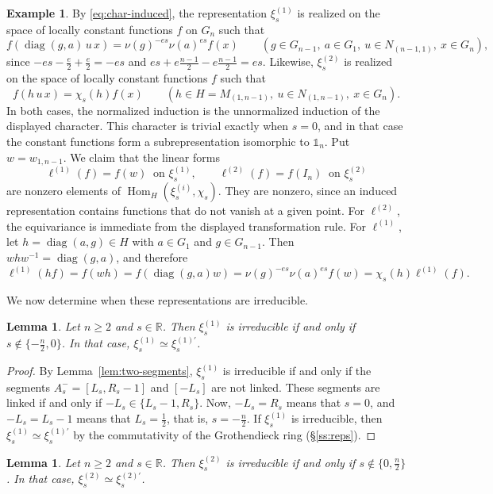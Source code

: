 \documentclass[11pt]{amsart}
\numberwithin{equation}{section}
\theoremstyle{plain}
\newtheorem{lemma}[theorem]{Lemma}
\theoremstyle{definition}
\newtheorem{example}[theorem]{Example}
\theoremstyle{remark}
\newcommand{\R}{\mathbb{R}}
\newcommand{\one}{\mathds{1}}
\DeclareMathOperator{\Hom}{Hom}
\DeclareMathOperator{\diag}{diag}
\newcommand{\xione}{\xi^{(1)}}
\newcommand{\xitwo}{\xi^{(2)}}
\begin{document}
\begin{example}\label{ex:dps-functionals}
	By \eqref{eq:char-induced}, the representation $\xione_s$ is realized on the space of locally constant functions $f$ on $G_n$ such that
	$$
	f(\diag(g,a)\,u\,x)=\nu(g)^{-es}\nu(a)^{es}f(x)\qquad(g\in G_{n-1},\ a\in G_1,\ u\in N_{(n-1,1)},\ x\in G_n),
	$$
	since $-es-\frac e2+\frac e2=-es$ and $es+e\frac{n-1}2-e\frac{n-1}2=es$. Likewise, $\xitwo_s$ is realized on the space of locally constant functions $f$ such that
	$$
	f(h\,u\,x)=\chi_s(h)f(x)\qquad(h\in H=M_{(1,n-1)},\ u\in N_{(1,n-1)},\ x\in G_n).
	$$
	In both cases, the normalized induction is the unnormalized induction of the displayed character. This character is trivial exactly when $s=0$, and in that case the constant functions form a subrepresentation isomorphic to $\one_n$. Put $w=w_{1,n-1}$. We claim that the linear forms
	$$
	\ell^{(1)}(f)=f(w)\ \text{ on }\xione_s,\qquad \ell^{(2)}(f)=f(I_n)\ \text{ on }\xitwo_s
	$$
	are nonzero elements of $\Hom_H(\xi^{(i)}_s,\chi_s)$. They are nonzero, since an induced representation contains functions that do not vanish at a given point. For $\ell^{(2)}$, the equivariance is immediate from the displayed transformation rule. For $\ell^{(1)}$, let $h=\diag(a,g)\in H$ with $a\in G_1$ and $g\in G_{n-1}$. Then $whw^{-1}=\diag(g,a)$, and therefore
	$$
	\ell^{(1)}(hf)=f(wh)=f(\diag(g,a)w)=\nu(g)^{-es}\nu(a)^{es}f(w)=\chi_s(h)\ell^{(1)}(f).
	$$
\end{example}

We now determine when these representations are irreducible.

\begin{lemma}\label{lem:dps-irred}
	Let $n\ge2$ and $s\in\R$. Then $\xione_s$ is irreducible if and only if $s\notin\{-\frac n2,0\}$. In that case, $\xione_s\simeq\xi^{(1)\prime}_s$.
\end{lemma}

\begin{proof}
	By Lemma~\ref{lem:two-segments}, $\xione_s$ is irreducible if and only if the segments $A_s^-=[L_s,R_s-1]$ and $[-L_s]$ are not linked. These segments are linked if and only if $-L_s\in\{L_s-1,R_s\}$. Now, $-L_s=R_s$ means that $s=0$, and $-L_s=L_s-1$ means that $L_s=\frac12$, that is, $s=-\frac n2$. If $\xione_s$ is irreducible, then $\xione_s\simeq\xi^{(1)\prime}_s$ by the commutativity of the Grothendieck ring (\S\ref{ss:reps}).
\end{proof}

\begin{lemma}\label{lem:dps2-irred}
	Let $n\ge2$ and $s\in\R$. Then $\xitwo_s$ is irreducible if and only if $s\notin\{0,\frac n2\}$. In that case, $\xitwo_s\simeq\xi^{(2)\prime}_s$.
\end{lemma}
\end{document}
